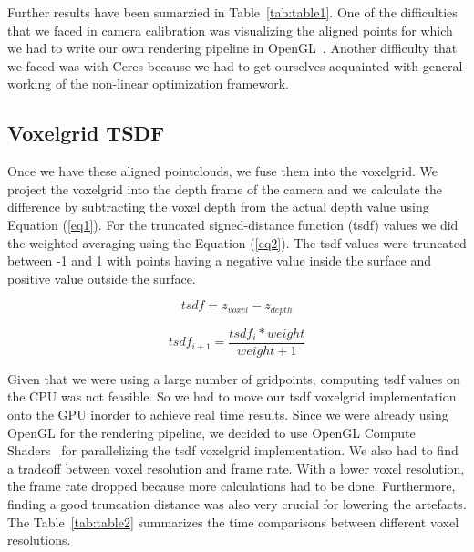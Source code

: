 \documentclass[10pt,twocolumn,letterpaper]{article}
\begin{document}
Further results have been sumarzied in Table~\ref{tab:table1}. One of the difficulties that we faced in camera calibration was visualizing the aligned points for which we had to write our own rendering pipeline in OpenGL~\cite{Authors3}. Another difficulty that we faced was with Ceres because we had to get ourselves acquainted with general working of the non-linear optimization framework. 
\subsection{Voxelgrid TSDF}
Once we have these aligned pointclouds, we fuse them into the voxelgrid. We project the voxelgrid into the depth frame of the camera and we calculate the difference by subtracting the voxel depth from the actual depth value using Equation (\ref{eq1}). For the truncated signed-distance function (tsdf) values we did the weighted averaging using the Equation (\ref{eq2}). The tsdf values were truncated between -1 and 1 with points having a negative value inside the surface and positive value outside the surface.

\begin{equation}\label{eq1}
tsdf=z_{voxel} - z_{depth}
\end{equation}

\begin{equation}\label{eq2}
tsdf_{i+1}=\frac{tsdf_{i} * weight}{weight+1}
\end{equation}

Given that we were using a large number of gridpoints, computing tsdf values on the CPU was not feasible. So we had to move our tsdf voxelgrid implementation onto the GPU inorder to achieve real time results. Since we were already using OpenGL for the rendering pipeline, we decided to use OpenGL Compute Shaders~\cite{Authors1} for parallelizing the tsdf voxelgrid implementation. We also had to find a tradeoff between voxel resolution and frame rate. With a lower voxel resolution, the frame rate dropped because more calculations had to be done. Furthermore, finding a good truncation distance was also very crucial for lowering the artefacts. The Table~\ref{tab:table2} summarizes the time comparisons between different voxel resolutions.
\end{document}
